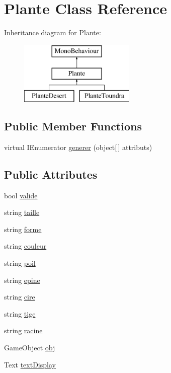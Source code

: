 \hypertarget{class_plante}{}\section{Plante Class Reference}
\label{class_plante}
Inheritance diagram for Plante\+:\begin{figure}[H]
\begin{center}
\leavevmode
\includegraphics[height=3.000000cm]{class_plante}
\end{center}
\end{figure}
\subsection*{Public Member Functions}
\begin{DoxyCompactItemize}
\item 
virtual I\+Enumerator \mbox{\hyperlink{class_plante_a57fe2932f99367a29150ac5280fda729}{generer}} (object\mbox{[}$\,$\mbox{]} attributs)
\end{DoxyCompactItemize}
\subsection*{Public Attributes}
\begin{DoxyCompactItemize}
\item 
bool \mbox{\hyperlink{class_plante_ab6bc3966db0acef8fda5e1cda03699db}{valide}}
\item 
string \mbox{\hyperlink{class_plante_a0de900c1e4a2bbe53c90e6f06ce5bde7}{taille}}
\item 
string \mbox{\hyperlink{class_plante_aeab55bfbb7b0aacf9348d63acb955c6a}{forme}}
\item 
string \mbox{\hyperlink{class_plante_a958eb820071675fab9b6954023ca6cf4}{couleur}}
\item 
string \mbox{\hyperlink{class_plante_a504f4c475829bc77cc9cae5dd52981da}{poil}}
\item 
string \mbox{\hyperlink{class_plante_a5a3be50e6316f5514226d76875e14c63}{epine}}
\item 
string \mbox{\hyperlink{class_plante_a036a4950846e298397513d996edfb181}{cire}}
\item 
string \mbox{\hyperlink{class_plante_a650c0b77797fc665e097edd0f456e3e9}{tige}}
\item 
string \mbox{\hyperlink{class_plante_a045a93b6b43ac35b8f34a86d791f07c2}{racine}}
\item 
Game\+Object \mbox{\hyperlink{class_plante_a9652c0e9525d969b74a871bf3c3f220b}{obj}}
\item 
Text \mbox{\hyperlink{class_plante_af0250d69ce2260010e6a0f95af0c07ce}{text\+Display}}
\end{DoxyCompactItemize}
